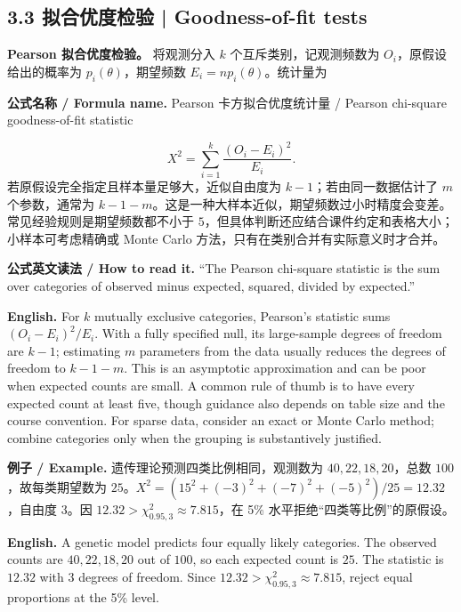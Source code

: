 \documentclass[UTF8,11pt,a4paper]{ctexart}
\newcommand{\EN}[1]{\par\noindent\textbf{English.} #1\par}
\newcommand{\READ}[1]{\par\noindent\textbf{公式英文读法 / How to read it.} #1\par}
\newcommand{\FORMULA}[2]{\par\noindent\textbf{公式名称 / Formula name.} #1 / #2\par}
\newcommand{\EX}[2]{\par\noindent\textbf{例子 / Example.} #1\par\EN{#2}}
\begin{document}
\subsection*{3.3 拟合优度检验 | Goodness-of-fit tests}
\noindent\textbf{Pearson 拟合优度检验。} 将观测分入 $k$ 个互斥类别，记观测频数为 $O_i$，原假设给出的概率为 $p_i(\theta)$，期望频数 $E_i=np_i(\theta)$。统计量为
\FORMULA{Pearson 卡方拟合优度统计量}{Pearson chi-square goodness-of-fit statistic}
\[
X^2=\sum_{i=1}^k\frac{(O_i-E_i)^2}{E_i}.
\]
若原假设完全指定且样本量足够大，近似自由度为 $k-1$；若由同一数据估计了 $m$ 个参数，通常为 $k-1-m$。这是一种大样本近似，期望频数过小时精度会变差。常见经验规则是期望频数都不小于 $5$，但具体判断还应结合课件约定和表格大小；小样本可考虑精确或 Monte Carlo 方法，只有在类别合并有实际意义时才合并。
\READ{“The Pearson chi-square statistic is the sum over categories of observed minus expected, squared, divided by expected.”}
\EN{For $k$ mutually exclusive categories, Pearson's statistic sums $(O_i-E_i)^2/E_i$. With a fully specified null, its large-sample degrees of freedom are $k-1$; estimating $m$ parameters from the data usually reduces the degrees of freedom to $k-1-m$. This is an asymptotic approximation and can be poor when expected counts are small. A common rule of thumb is to have every expected count at least five, though guidance also depends on table size and the course convention. For sparse data, consider an exact or Monte Carlo method; combine categories only when the grouping is substantively justified.}

\EX{遗传理论预测四类比例相同，观测数为 $40,22,18,20$，总数 $100$，故每类期望数为 $25$。$X^2=(15^2+(-3)^2+(-7)^2+(-5)^2)/25=12.32$，自由度 $3$。因 $12.32>\chi^2_{0.95,3}\approx7.815$，在 5\% 水平拒绝“四类等比例”的原假设。}{A genetic model predicts four equally likely categories. The observed counts are $40,22,18,20$ out of $100$, so each expected count is $25$. The statistic is $12.32$ with $3$ degrees of freedom. Since $12.32>\chi^2_{0.95,3}\approx7.815$, reject equal proportions at the 5\% level.}
\end{document}
